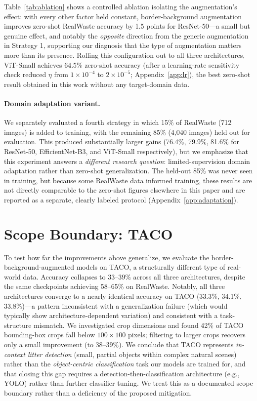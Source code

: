 \documentclass[a4paper]{article}
\begin{document}
Table~\ref{tab:ablation} shows a controlled ablation isolating the augmentation's effect: with every other factor held constant, border-background augmentation improves zero-shot RealWaste accuracy by 1.5 points for ResNet-50---a small but genuine effect, and notably the \emph{opposite} direction from the generic augmentation in Strategy 1, supporting our diagnosis that the type of augmentation matters more than its presence. Rolling this configuration out to all three architectures, ViT-Small achieves 64.5\% zero-shot accuracy (after a learning-rate sensitivity check reduced $\eta$ from $1\times10^{-4}$ to $2\times10^{-5}$; Appendix~\ref{app:lr}), the best zero-shot result obtained in this work without any target-domain data.

\paragraph{Domain adaptation variant.} We separately evaluated a fourth strategy in which 15\% of RealWaste (712 images) is added to training, with the remaining 85\% (4{,}040 images) held out for evaluation. This produced substantially larger gains (76.4\%, 79.9\%, 81.6\% for ResNet-50, EfficientNet-B3, and ViT-Small respectively), but we emphasize that this experiment answers a \emph{different research question}: limited-supervision domain adaptation rather than zero-shot generalization. The held-out 85\% was never seen in training, but because some RealWaste data informed training, these results are not directly comparable to the zero-shot figures elsewhere in this paper and are reported as a separate, clearly labeled protocol (Appendix~\ref{app:adaptation}).

\section{Scope Boundary: TACO}
\label{sec:taco}

To test how far the improvements above generalize, we evaluate the border-background-augmented models on TACO, a structurally different type of real-world data. Accuracy collapses to 33--39\% across all three architectures, despite the same checkpoints achieving 58--65\% on RealWaste. Notably, all three architectures converge to a nearly identical accuracy on TACO (33.3\%, 34.1\%, 33.8\%)---a pattern inconsistent with a generalization failure (which would typically show architecture-dependent variation) and consistent with a task-structure mismatch. We investigated crop dimensions and found 42\% of TACO bounding-box crops fall below $100\times100$ pixels; filtering to larger crops recovers only a small improvement (to 38--39\%). We conclude that TACO represents \emph{in-context litter detection} (small, partial objects within complex natural scenes) rather than the \emph{object-centric classification} task our models are trained for, and that closing this gap requires a detection-then-classification architecture (e.g., YOLO) rather than further classifier tuning. We treat this as a documented scope boundary rather than a deficiency of the proposed mitigation.
\end{document}
